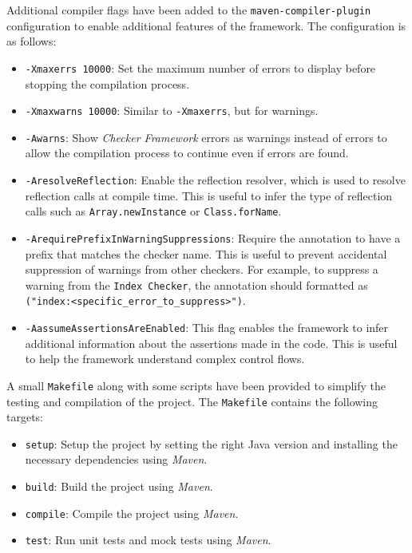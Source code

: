 \documentclass[a4paper, 11pt]{article}
\begin{document}
Additional compiler flags have been added to the \texttt{maven-compiler-plugin} configuration to enable additional features of the framework. The configuration is as follows:

\begin{itemize}
	\item \texttt{-Xmaxerrs 10000}: Set the maximum number of errors to display before stopping the compilation process.

	\item \texttt{-Xmaxwarns 10000}: Similar to \texttt{-Xmaxerrs}, but for warnings.

	\item \texttt{-Awarns}: Show \textit{Checker Framework} errors as warnings instead of errors to allow the compilation process to continue even if errors are found.

	\item \texttt{-AresolveReflection}: Enable the reflection resolver, which is used to resolve reflection calls at compile time. This is useful to infer the type of reflection calls such as \texttt{Array.newInstance} or \texttt{Class.forName}.

	\item \texttt{-ArequirePrefixInWarningSuppressions}: Require the \texttt{\@SuppressWarnings} annotation to have a prefix that matches the checker name. This is useful to prevent accidental suppression of warnings from other checkers. For example, to suppress a warning from the \texttt{Index Checker}, the annotation should formatted as \texttt{\@SuppressWarnings("index:<specific\_error\_to\_suppress>")}.

	\item \texttt{-AassumeAssertionsAreEnabled}: This flag enables the framework to infer additional information about the assertions made in the code. This is useful to help the framework understand complex control flows.
\end{itemize}

A small \texttt{Makefile} along with some scripts have been provided to simplify the testing and compilation of the project. The \texttt{Makefile} contains the following targets:

\begin{itemize}
	\item \texttt{setup}: Setup the project by setting the right Java version and installing the necessary dependencies using \textit{Maven}.

	\item \texttt{build}: Build the project using \textit{Maven}.

	\item \texttt{compile}: Compile the project using \textit{Maven}.

	\item \texttt{test}: Run unit tests and mock tests using \textit{Maven}.
\end{itemize}
\end{document}

